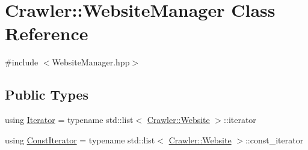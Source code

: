 \hypertarget{class_crawler_1_1_website_manager}{}\section{Crawler\+:\+:Website\+Manager Class Reference}
\label{class_crawler_1_1_website_manager}


{\ttfamily \#include $<$Website\+Manager.\+hpp$>$}

\subsection*{Public Types}
\begin{DoxyCompactItemize}
\item 
using \hyperlink{class_crawler_1_1_website_manager_a73a0d579dfd90c0f5eab55c0f0ae82a8}{Iterator} = typename std\+::list$<$ \hyperlink{class_crawler_1_1_website}{Crawler\+::\+Website} $>$\+::iterator
\item 
using \hyperlink{class_crawler_1_1_website_manager_a5540e8864e8c8defbf06ebfc3aa6c7c8}{Const\+Iterator} = typename std\+::list$<$ \hyperlink{class_crawler_1_1_website}{Crawler\+::\+Website} $>$\+::const\+\_\+iterator
\end{DoxyCompactItemize}
